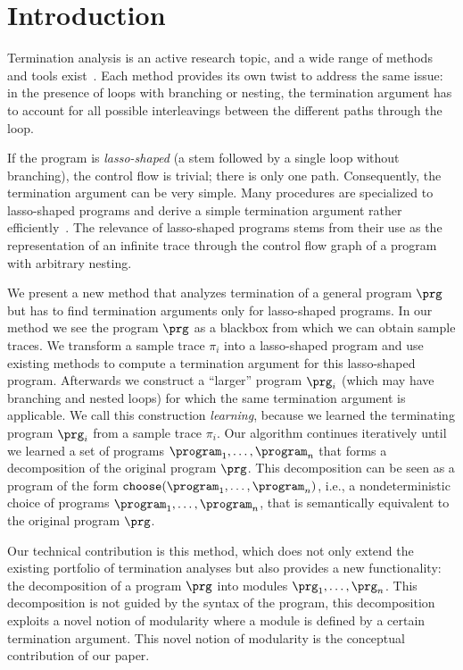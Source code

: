 \section{Introduction}
 
Termination analysis is an active research topic, and a wide range of methods and tools exist~\cite{pldi/CookPR06,conf/tacas/CookSZ13,sas/HarrisLNR10,cav/KroeningSTW10,cav/LeeWY12,tacas/PopeeaR12,conf/esop/UrbanM14}. Each method provides its own twist to address the same issue: in the presence of loops with branching or nesting, the termination argument has to account for all possible interleavings between the different paths through the loop. 

If the program is \emph{lasso-shaped} (a stem followed by a single loop without branching), the control flow is trivial; there is only one path.
Consequently, the termination argument can be very simple.  Many procedures are specialized to lasso-shaped programs and derive a simple termination argument rather efficiently~\cite{cav/Ben-Amram09,popl/Ben-AmramG13,cav/BradleyMS05,tacas/CookKRW10,conf/atva/HeizmannHLP13,conf/tacas/LeikeH14,vmcai/PodelskiR04}. The relevance of lasso-shaped programs stems from their use as the representation of an infinite trace through the control flow graph of a program with arbitrary nesting.



We present a new method that analyzes termination of a general program $\prg$ but has to find termination arguments only for lasso-shaped programs.
In our method we see the program $\prg$ as a blackbox from which we can obtain sample traces. 
We transform a sample trace $\pi_i$ into a lasso-shaped program and use existing methods to compute a termination argument for this lasso-shaped program.  
Afterwards we construct a ``larger'' program $\prg_i$ (which may have branching and nested loops) for which the same termination argument is applicable.
We call this construction \emph{learning}, because we learned the terminating program $\prg_i$ from a sample trace $\pi_i$.
Our algorithm continues iteratively until we learned a set of programs $\program_1,\ldots,\program_n$ that forms a decomposition of the original program $\prg$.
This decomposition can be seen as a program of the form $\mathtt{choose}(\program_1,\ldots,\program_n)$, i.e., a nondeterministic choice of programs $\program_1,\ldots,\program_n$, that is semantically equivalent to the original program $\prg$.


Our technical contribution is this method, which does not only extend the existing portfolio of termination analyses but also provides a new functionality: the decomposition of a program $\prg$ into modules $\prg_1,\ldots,\prg_n$.  
This decomposition is not guided by the syntax of the program, this decomposition exploits a novel notion of modularity where a module is defined by a certain termination argument. This novel notion of modularity is the conceptual contribution of our paper.




